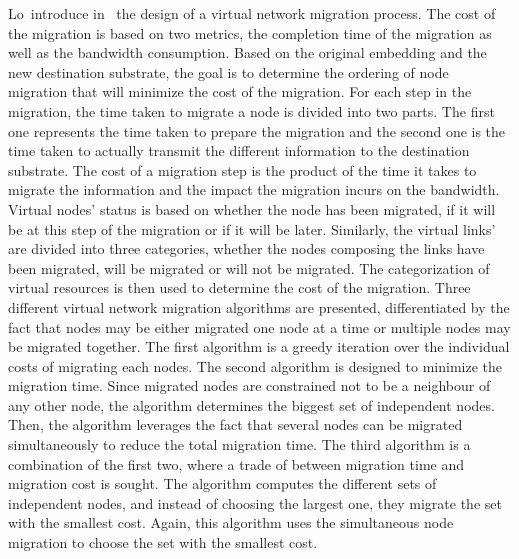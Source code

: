 Lo~\etal introduce in~\cite{vnm-lo2013} the design of a virtual network migration process.
The cost of the migration is based on two metrics, the completion time of the migration as well as the bandwidth consumption.
Based on the original embedding and the new destination substrate, the goal is to determine the ordering of node migration that will minimize the cost of the migration.
For each step in the migration, the time taken to migrate a node is divided into two parts. The first one represents the time taken to prepare the migration and the second one is the time taken to actually transmit the different information to the destination substrate.
The cost of a migration step is the product of the time it takes to migrate the information and the impact the migration incurs on the bandwidth.
Virtual nodes' status is based on whether the node has been migrated, if it will be at this step of the migration or if it will be later.
Similarly, the virtual links' are divided into three categories, whether the nodes composing the links have been migrated, will be migrated or will not be migrated.
The categorization of virtual resources is then used to determine the cost of the migration.
Three different virtual network migration algorithms are presented, differentiated by the fact that nodes may be either migrated one node at a time or multiple nodes may be migrated together.
The first algorithm is a greedy iteration over the individual costs of migrating each nodes.
The second algorithm is designed to minimize the migration time. Since migrated nodes are constrained not to be a neighbour of any other node, the algorithm determines the biggest set of independent nodes.
Then, the algorithm leverages the fact that several nodes can be migrated simultaneously to reduce the total migration time.
The third algorithm is a combination of the first two, where a trade of between migration time and migration cost is sought. The algorithm computes the different sets of independent nodes, and instead of choosing the largest one, they migrate the set with the smallest cost.
Again, this algorithm uses the simultaneous node migration to choose the set with the smallest cost.

